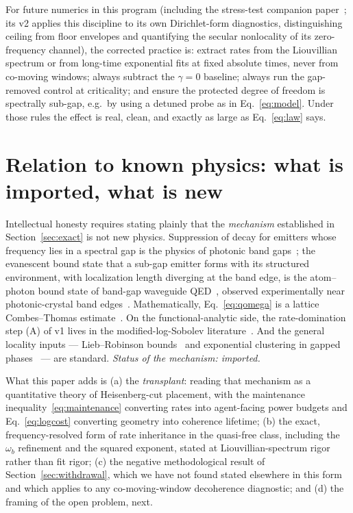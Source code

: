 \documentclass[11pt,a4paper]{article}
\theoremstyle{remark}
\begin{document}
For future numerics in this program (including the stress-test companion
paper~\cite{Eriksson0070}; its v2 applies this discipline to its own Dirichlet-form
diagnostics, distinguishing ceiling from floor envelopes and quantifying the secular
nonlocality of its zero-frequency channel), the corrected practice is: extract rates from the Liouvillian spectrum or from
long-time exponential fits at fixed absolute times, never from co-moving windows; always
subtract the $\gamma = 0$ baseline; always run the gap-removed control at criticality; and
ensure the protected degree of freedom is spectrally sub-gap, e.g.\ by using a detuned
probe as in Eq.~\eqref{eq:model}. Under those rules the effect is real, clean, and
exactly as large as Eq.~\eqref{eq:law} says.

\section{Relation to known physics: what is imported, what is new}
\label{sec:related}

Intellectual honesty requires stating plainly that the \emph{mechanism} established in
Section~\ref{sec:exact} is not new physics. Suppression of decay for emitters whose
frequency lies in a spectral gap is the physics of photonic band
gaps~\cite{Bykov1975,JohnWang1990,JohnQuang1994}; the evanescent bound state that a
sub-gap emitter forms with its structured environment, with localization length diverging
at the band edge, is the atom--photon bound state of band-gap waveguide
QED~\cite{Douglas2015,Calajo2016}, observed experimentally near photonic-crystal band
edges~\cite{Hood2016}. Mathematically, Eq.~\eqref{eq:qomega} is a lattice Combes--Thomas
estimate~\cite{CombesThomas1973}. On the functional-analytic side, the rate-domination
step (A) of v1 lives in the modified-log-Sobolev
literature~\cite{KastoryanoTemme2013,CapelRouze2020}. And the general locality
inputs --- Lieb--Robinson bounds~\cite{LiebRobinson1972,Poulin2010} and exponential
clustering in gapped phases~\cite{HastingsKoma2006} --- are standard. \emph{Status of the
mechanism: imported.}

What this paper adds is (a) the \emph{transplant}: reading that mechanism as a
quantitative theory of Heisenberg-cut placement, with the maintenance
inequality~\eqref{eq:maintenance} converting rates into agent-facing power budgets and
Eq.~\eqref{eq:logcost} converting geometry into coherence lifetime; (b) the exact,
frequency-resolved form of rate inheritance in the quasi-free class, including the
$\omega_b$ refinement and the squared exponent, stated at Liouvillian-spectrum rigor
rather than fit rigor; (c) the negative methodological result of
Section~\ref{sec:withdrawal}, which we have not found stated elsewhere in this form and
which applies to any co-moving-window decoherence diagnostic; and (d) the framing of the
open problem, next.
\end{document}
